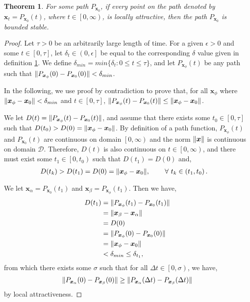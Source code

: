 \documentclass{article}
\newcommand{\B}[1]{\boldsymbol{#1}}
\DeclarePairedDelimiter\norm{\lVert}{\rVert}%
\newtheorem{theorem}{Theorem}[section]
\theoremstyle{definition}
\theoremstyle{remark}
\begin{document}
\begin{theorem}
  \label{Attractiveness Stability}
  For some path $P_{\B{x}_0}$, if every point on the path denoted by
  $\B{x}_t = P_{\B{x}_0}(t)$, where $t \in \left[0, \infty \right)$, is locally attractive,
  then the path $P_{\B{x}_0}$ is bounded stable.
\end{theorem}

\begin{proof}
  Let $\tau > 0$ be an arbitrarily large length of time.
  For a given $\epsilon > 0$ and some $t \in [0, \tau]$, let $\delta_t \in \left(0,\epsilon\right]$ be equal to the
  corresponding $\delta$ value given in definition \ref{Attractiveness Stability}.
  We define $\delta_{min} = min\{ \delta_t: 0 \leq t \leq \tau\}$, and let $P_{\B{x}_\phi}(t)$ be any path such that $\norm{P_{\B{x}_\phi}(0)-P_{\B{x}_0}(0)} < \delta_{min}$.

  In the following, we use proof by contradiction to prove that, for all $\B{x}_\phi$ where $\norm{\B{x}_\phi - \B{x}_0} < \delta_{min}$ and $t \in [0, \tau]$, $\norm{P_{\B{x}_\phi}(t)-P_{\B{x}_0}(t)} \leq \norm{\B{x}_\phi - \B{x}_0}$.

  We let $D(t) = \norm{P_{\B{x}_\phi}(t)-P_{\B{x}_0}(t)}$, and assume that there exists
  some $t_0 \in [0, \tau]$ such that $D(t_0) > D(0) = \norm{\B{x}_\phi - \B{x}_0}$.
  By definition of a path function, $P_{\B{x}_\phi}(t)$ and $P_{\B{x}_0}(t)$ are continuous on domain
  $\left[0, \infty\right)$ and the norm $\norm{\B{x}}$ is continuous on domain $\mathcal{D}$.
  Therefore, $D(t)$ is also continuous on $t \in \left[0, \infty\right)$, and there must exist some $t_1 \in \left[0, t_0\right)$
  such that $D(t_1) = D(0)$ and,
  \begin{align}
  D(t_k) > D(t_1) = D(0) = \norm{\B{x}_\phi - \B{x}_0}, ~~~~~~~ &\forall ~t_k \in \left(t_1, t_0\right).  \label{contradiction}
  \end{align}

  We let $\B{x}_\alpha = P_{\B{x}_0}(t_1)$ and $\B{x}_\beta = P_{\B{x}_\phi}(t_1)$. Then we have,
  \begin{align}
  D(t_1) &= \norm{P_{\B{x}_\phi}(t_1)-P_{\B{x}_0}(t_1)} \nonumber\\
  &= \norm{\B{x}_\beta - \B{x}_\alpha} \nonumber\\
  &= D(0) \nonumber\\
  & = \norm{P_{\B{x}_\phi}(0)-P_{\B{x}_0}(0)} \nonumber\\
  &= \norm{\B{x}_\phi - \B{x}_0} \nonumber\\
  &< \delta_{min} \leq \delta_{t_1},
  \end{align}
  from which there exists some $\sigma$ such that for all $\Delta t \in \left[0, \sigma\right)$, we have,
  \begin{align}
  \norm{P_{\B{x}_\alpha}(0) - P_{\B{x}_\beta}(0)} \ge \norm{P_{\B{x}_\alpha}(\Delta t) - P_{\B{x}_{\beta}}(\Delta t)} \label{attractiveness}
  \end{align}
  by local attractiveness.
      

\end{proof}
\end{document}
